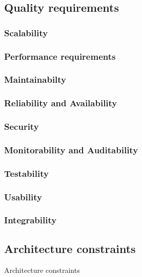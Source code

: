 \documentclass[10pt]{article}
\begin{document}
\subsection{Quality requirements} %
\subsubsection{Scalability}

\subsubsection{Performance requirements}

\subsubsection{Maintainabilty}

\subsubsection{Reliability and Availability}

\subsubsection{Security}

\subsubsection{Monitorability and Auditability}

\subsubsection{Testability}

\subsubsection{Usability}

\subsubsection{Integrability}




\clearpage
\subsection{Architecture constraints} %
Architecture constraints
\end{document}

